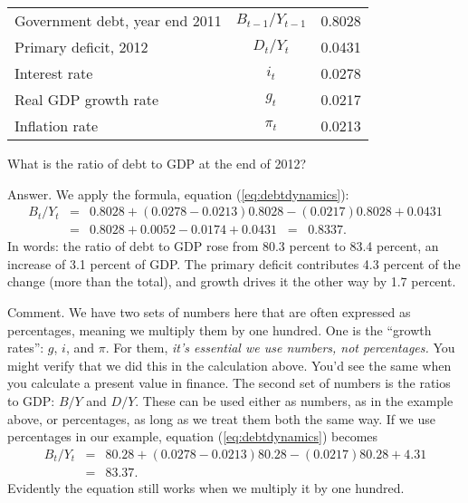 \begin{center}
\begin{tabular}{lcr}
\toprule
%
Government debt, year end 2011  &  $B_{t-1}/Y_{t-1}$ & 0.8028 \\
Primary deficit, 2012           &  $D_t/Y_t$         & 0.0431 \\
Interest rate                   &  $i_t$             & 0.0278 \\
Real GDP growth rate            &  $g_t$             & 0.0217 \\
Inflation rate                  &  $\pi_t$           & 0.0213 \\
\bottomrule
\end{tabular}
\end{center}

What is the ratio of debt to GDP at the end of 2012?

Answer.  We apply the formula, equation (\ref{eq:debtdynamics}):
\begin{eqnarray*}
    {B_{t}}/{Y_{t}} &=&  0.8028  + (0.0278-0.0213)0.8028 - (0.0217) 0.8028 + 0.0431 \\
            &=&  0.8028 + 0.0052 - 0.0174 + 0.0431 \;\;=\;\; 0.8337.
\end{eqnarray*}
In words:  the ratio of debt to GDP rose from 80.3 percent to 83.4 percent,
an increase of 3.1 percent of GDP.
The primary deficit contributes 4.3 percent of the change (more than the total),
and growth drives it the other way by 1.7 percent.

Comment.  We have two sets of numbers here that are often expressed
as percentages, meaning we multiply them by one hundred.
One is the ``growth rates'':  $g$, $i$, and $\pi$.
For them, {\it it's essential we use numbers, not percentages.\/}
You might verify that we did this in the calculation above.
You'd see the same when you calculate a present value in finance.
The second set of numbers is the ratios to GDP:  $B/Y$ and $D/Y$.
These can be used either as numbers, as in the example above, or percentages,
as long as we treat them both the same way.
If we use percentages in our example,
equation (\ref{eq:debtdynamics}) becomes
\begin{eqnarray*}
    {B_{t}}/{Y_{t}} &=&  80.28  + (0.0278-0.0213) 80.28 - (0.0217) 80.28 + 4.31 \\
            &=&  83.37.
\end{eqnarray*}
Evidently the equation still works when we multiply it by one hundred.



